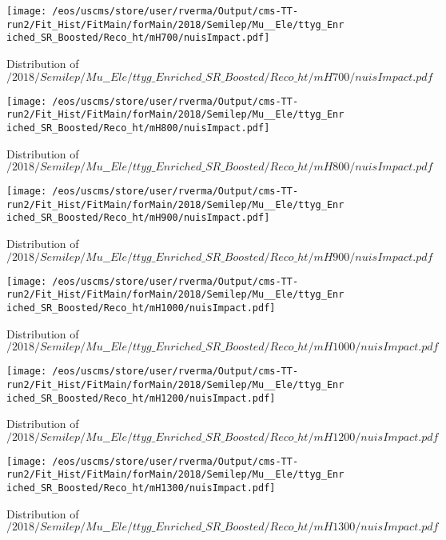 \begin{figure}
\centering
\texttt{[image: /eos/uscms/store/user/rverma/Output/cms-TT-run2/Fit\_Hist/FitMain/forMain/2018/Semilep/Mu\_\_Ele/ttyg\_Enriched\_SR\_Boosted/Reco\_ht/mH700/nuisImpact.pdf]}
\caption{Distribution of $/2018/Semilep/Mu\_\_Ele/ttyg\_Enriched\_SR\_Boosted/Reco\_ht/mH700/nuisImpact.pdf$}
\end{figure}

\begin{figure}
\centering
\texttt{[image: /eos/uscms/store/user/rverma/Output/cms-TT-run2/Fit\_Hist/FitMain/forMain/2018/Semilep/Mu\_\_Ele/ttyg\_Enriched\_SR\_Boosted/Reco\_ht/mH800/nuisImpact.pdf]}
\caption{Distribution of $/2018/Semilep/Mu\_\_Ele/ttyg\_Enriched\_SR\_Boosted/Reco\_ht/mH800/nuisImpact.pdf$}
\end{figure}

\begin{figure}
\centering
\texttt{[image: /eos/uscms/store/user/rverma/Output/cms-TT-run2/Fit\_Hist/FitMain/forMain/2018/Semilep/Mu\_\_Ele/ttyg\_Enriched\_SR\_Boosted/Reco\_ht/mH900/nuisImpact.pdf]}
\caption{Distribution of $/2018/Semilep/Mu\_\_Ele/ttyg\_Enriched\_SR\_Boosted/Reco\_ht/mH900/nuisImpact.pdf$}
\end{figure}

\begin{figure}
\centering
\texttt{[image: /eos/uscms/store/user/rverma/Output/cms-TT-run2/Fit\_Hist/FitMain/forMain/2018/Semilep/Mu\_\_Ele/ttyg\_Enriched\_SR\_Boosted/Reco\_ht/mH1000/nuisImpact.pdf]}
\caption{Distribution of $/2018/Semilep/Mu\_\_Ele/ttyg\_Enriched\_SR\_Boosted/Reco\_ht/mH1000/nuisImpact.pdf$}
\end{figure}

\begin{figure}
\centering
\texttt{[image: /eos/uscms/store/user/rverma/Output/cms-TT-run2/Fit\_Hist/FitMain/forMain/2018/Semilep/Mu\_\_Ele/ttyg\_Enriched\_SR\_Boosted/Reco\_ht/mH1200/nuisImpact.pdf]}
\caption{Distribution of $/2018/Semilep/Mu\_\_Ele/ttyg\_Enriched\_SR\_Boosted/Reco\_ht/mH1200/nuisImpact.pdf$}
\end{figure}

\begin{figure}
\centering
\texttt{[image: /eos/uscms/store/user/rverma/Output/cms-TT-run2/Fit\_Hist/FitMain/forMain/2018/Semilep/Mu\_\_Ele/ttyg\_Enriched\_SR\_Boosted/Reco\_ht/mH1300/nuisImpact.pdf]}
\caption{Distribution of $/2018/Semilep/Mu\_\_Ele/ttyg\_Enriched\_SR\_Boosted/Reco\_ht/mH1300/nuisImpact.pdf$}
\end{figure}

